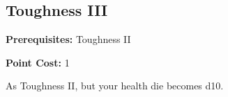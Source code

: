 \subsection{Toughness III}\label{feat:toughness3}

\noindent
\textbf{Prerequisites:} Toughness II

\noindent
\textbf{Point Cost:} 1 

As Toughness II, but your health die becomes d10.
